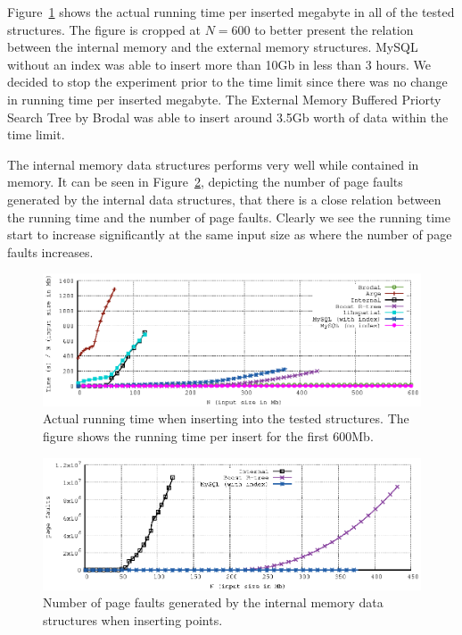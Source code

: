 \documentclass[twoside,11pt,openright]{report}
\begin{document}
Figure~\ref{fig:actual_insert_time} shows the actual running time per inserted megabyte in all of the tested structures. The figure is cropped at $N = 600$ to better present the relation between the internal memory and the external memory structures. MySQL without an index was able to insert more than 10Gb in less than 3 hours. We decided to stop the experiment prior to the time limit since there was no change in running time per inserted megabyte. The External Memory Buffered Priorty Search Tree by Brodal was able to insert around 3.5Gb worth of data within the time limit.

The internal memory data structures performs very well while contained in memory. It can be seen in Figure~\ref{fig:insert_page_faults}, depicting the number of page faults generated by the internal data structures, that there is a close relation between the running time and the number of page faults. Clearly we see the running time start to increase significantly at the same input size as where the number of page faults increases.

\begin{figure}[t]
\centering
\includegraphics[width=\textwidth]{../src/experiments/insert_experiment_results/combined_results/time_over_asymptotic}
\caption{Actual running time when inserting into the tested structures. The figure shows the running time per insert for the first 600Mb.}
\label{fig:actual_insert_time}
\end{figure}

\begin{figure}[b]
\centering
\includegraphics[width=\textwidth]{../src/experiments/insert_experiment_results/combined_results/pfs}
\caption{Number of page faults generated by the internal memory data structures when inserting points.}
\label{fig:insert_page_faults}
\end{figure} 
\end{document}
